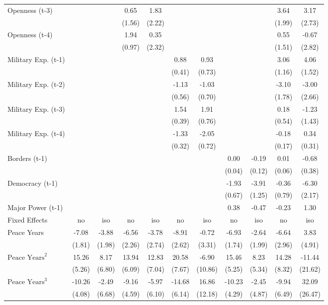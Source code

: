 \begin{tabular}{lcccccccccc}
Openness (t-3) &  &  & 0.65 & 1.83 &  &  &  &  & 3.64 & 3.17 \\
&  &  & (1.56) & (2.22) &  &  &  &  & (1.99) & (2.73) \\
Openness (t-4) &  &  & 1.94 & 0.35 &  &  &  &  & 0.55 & -0.67 \\
&  &  & (0.97) & (2.32) &  &  &  &  & (1.51) & (2.82) \\
Military Exp. (t-1) &  &  &  &  & 0.88 & 0.93 &  &  & 3.06 & 4.06 \\
&  &  &  &  & (0.41) & (0.73) &  &  & (1.16) & (1.52) \\
Military Exp. (t-2) &  &  &  &  & -1.13 & -1.03 &  &  & -3.10 & -3.00 \\
&  &  &  &  & (0.56) & (0.70) &  &  & (1.78) & (2.66) \\
Military Exp. (t-3) &  &  &  &  & 1.54 & 1.91 &  &  & 0.18 & -1.23 \\
&  &  &  &  & (0.39) & (0.76) &  &  & (0.54) & (1.43) \\
Military Exp. (t-4) &  &  &  &  & -1.33 & -2.05 &  &  & -0.18 & 0.34 \\
&  &  &  &  & (0.32) & (0.72) &  &  & (0.17) & (0.31) \\
Borders (t-1) &  &  &  &  &  &  & 0.00 & -0.19 & 0.01 & -0.68 \\
&  &  &  &  &  &  & (0.04) & (0.12) & (0.06) & (0.38) \\
Democracy (t-1) &  &  &  &  &  &  & -1.93 & -3.91 & -0.36 & -6.30 \\
&  &  &  &  &  &  & (0.67) & (1.25) & (0.79) & (2.17) \\
Major Power (t-1) &  &  &  &  &  &  & 0.38 & -0.47 & -0.23 & 1.30 \\
\midrule
Fixed Effects & no & iso & no & iso & no & iso & no & iso & no & iso \\
Peace Years & -7.08 & -3.88 & -6.56 & -3.78 & -8.91 & -0.72 & -6.93 & -2.64 & -6.64 & 3.83 \\
& (1.81) & (1.98) & (2.26) & (2.74) & (2.62) & (3.31) & (1.74) & (1.99) & (2.96) & (4.91) \\
$\text{Peace Years}^2$ & 15.26 & 8.17 & 13.94 & 12.83 & 20.58 & -6.90 & 15.46 & 8.23 & 14.28 & -11.44 \\
& (5.26) & (6.80) & (6.09) & (7.04) & (7.67) & (10.86) & (5.25) & (5.34) & (8.32) & (21.62) \\
$\text{Peace Years}^3$ & -10.26 & -2.49 & -9.16 & -5.97 & -14.68 & 16.86 & -10.23 & -2.45 & -9.94 & 32.09 \\
& (4.08) & (6.68) & (4.59) & (6.10) & (6.14) & (12.18) & (4.29) & (4.87) & (6.49) & (26.47) \\

\end{tabular}
